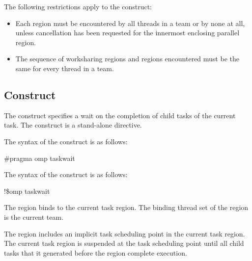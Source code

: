 \restrictions
The following restrictions apply to the  construct:

\begin{itemize}
\item Each  region must be encountered by all threads in a team or by none at all, 
unless cancellation has been requested for the innermost enclosing parallel region.

\item The sequence of worksharing regions and  regions encountered must be the 
same for every thread in a team.
\end{itemize}









\subsection{ Construct}
\label{subsec:taskwait Construct}
\summary
The  construct specifies a wait on the completion of child tasks of the 
current task. The  construct is a stand-alone directive.

\syntax
\ccppspecificstart
The syntax of the  construct is as follows:

\begin{boxedcode}
\#pragma omp taskwait 
\end{boxedcode}
\ccppspecificend

\fortranspecificstart
The syntax of the  construct is as follows:

\begin{boxedcode}
!\$omp taskwait 
\end{boxedcode}
\fortranspecificend

\binding
The  region binds to the current task region. The binding thread set of the 
 region is the current team.

\descr

The  region includes an implicit task scheduling point in the current task 
region. The current task region is suspended at the task scheduling point until all child 
tasks that it generated before the  region complete execution.










